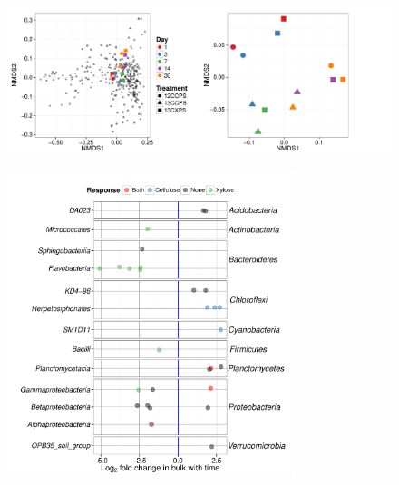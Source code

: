 \begin{figure}[H]
	\begin{center}
		\centerline{\includegraphics[width=\textwidth]{figures/bulk_ordination/bulk_ordination.pdf}}
	\caption[Ordination of bulk samples]{\protect}\label{fig:bulk_ord}
        \end{center}
\end{figure}

\begin{figure}[H] \begin{center}
\centerline{\includegraphics[width=0.75\textwidth]{figures/l2fc_time/l2fc_time.pdf}}
\caption[Temporal fluctuations for OTUs that changed significantly in abundance with time]{\protect}\label{fig:time}
\end{center} \end{figure}


